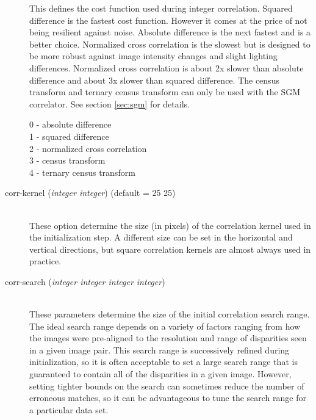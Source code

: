 \begin{description}
  This defines the cost function used during integer
  correlation. Squared difference is the fastest cost
  function. However it comes at the price of not being resilient
  against noise. Absolute difference is the next fastest and is a
  better choice. Normalized cross correlation is the slowest but is
  designed to be more robust against image intensity changes and
  slight lighting differences. Normalized cross correlation is about
  2x slower than absolute difference and about 3x slower than squared
  difference.  The census transform \citep{zabih1994census} and
  ternary census transform \citep{hua2016texture} can only be used with the 
  SGM correlator.  See section \ref{sec:sgm} for details.

  \begin{description}
    \item[0 - absolute difference]
    \item[1 - squared difference]
    \item[2 - normalized cross correlation]
    \item[3 - census transform]
    \item[4 - ternary census transform]
  \end{description}

\item[corr-kernel \textnormal{\small{(\emph{integer integer})}} (default = 25 25)] \hfill \\
  These option determine the size (in pixels) of the correlation
  kernel used in the initialization step.  A different size can be set
  in the horizontal and vertical directions, but square correlation
  kernels are almost always used in practice.

\item[corr-search \textnormal{\small{(\emph{integer integer integer integer})}}] \hfill \\
  These parameters determine the size of the initial correlation
  search range.  The ideal search range depends on a variety of
  factors ranging from how the images were pre-aligned to the
  resolution and range of disparities seen in a given image pair.
  This search range is successively refined during initialization, so
  it is often acceptable to set a large search range that is guaranteed
  to contain all of the disparities in a given image.  However,
  setting tighter bounds on the search can sometimes reduce the number
  of erroneous matches, so it can be advantageous to tune the
  search range for a particular data set.


\end{description}
